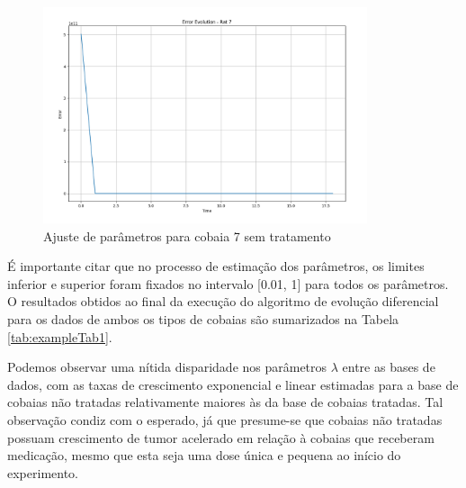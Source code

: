 \documentclass[12pt]{article}
\begin{document}
\begin{figure}[H]
    \centering
    \includegraphics[width=0.85\textwidth]{pic/error_yes.png}
    \caption{Ajuste de parâmetros para cobaia 7 sem tratamento}
    \label{fig:map4}
\end{figure}

É importante citar que no processo de estimação dos parâmetros, os limites inferior e superior foram fixados no intervalo [0.01, 1] para todos os parâmetros. O resultados obtidos ao final da execução do algoritmo de evolução diferencial para os dados de ambos os tipos de cobaias são sumarizados na Tabela \ref{tab:exampleTab1}.

\begin{table}[H]
    \centering
    \caption{Parâmetros estimados para cada tipo de cobaia}
    \label{tab:exampleTab1}
    \vspace{0.2cm}
\end{table}

Podemos observar uma nítida disparidade nos parâmetros \(\lambda\) entre as bases de dados, com as taxas de crescimento exponencial e linear estimadas para a base de cobaias não tratadas relativamente maiores às da base de cobaias tratadas. Tal observação condiz com o esperado, já que presume-se que cobaias não tratadas possuam crescimento de tumor acelerado em relação à cobaias que receberam medicação, mesmo que esta seja uma dose única e pequena ao início do experimento.
\end{document}
